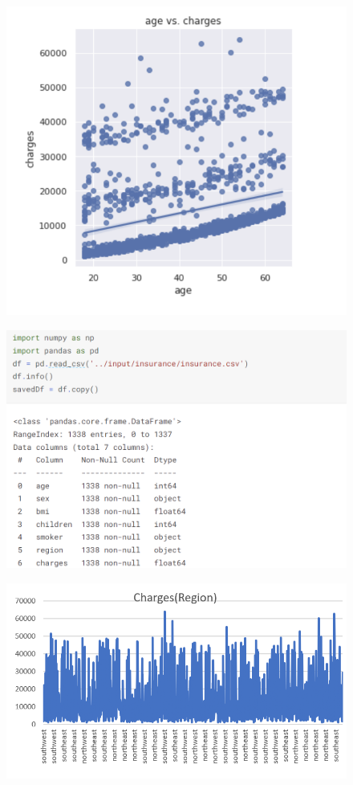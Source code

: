 \documentclass[journal]{IEEEtran}
\begin{document}
\begin{figure}[h]
  \centering
  \includegraphics [width= 3.55 in]{4.png}
\caption{}
  \label{storage}
\end{figure}



\begin{figure}[h]
  \centering
  \includegraphics [width= 3.55 in]{7.png}
\caption{}
  \label{storage}
\end{figure}





\begin{figure}[h]
  \centering
  \includegraphics [width= 3.55 in]{2.png}
\caption{}
  \label{storage}
\end{figure}
\end{document}
